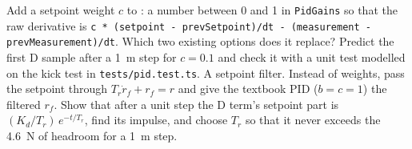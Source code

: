 \begin{exercises}
\exercise[2] Add a setpoint weight $c$ to : a number between 0 and 1 in \texttt{PidGains} so that the raw derivative is \texttt{c * (setpoint - prevSetpoint)/dt - (measurement - prevMeasurement)/dt}. Which two existing options does it replace? Predict the first D sample after a \SI{1}{m} step for $c = 0.1$ and check it with a unit test modelled on the kick test in \texttt{tests/pid.test.ts}.
\exercise[3] A setpoint filter. Instead of weights, pass the setpoint through $T_r\dot r_f + r_f = r$ and give the textbook PID ($b = c = 1$) the filtered $r_f$. Show that after a unit step the D term's setpoint part is $(K_d/T_r)\,e^{-t/T_r}$, find its impulse, and choose $T_r$ so that it never exceeds the \SI{4.6}{N} of headroom for a \SI{1}{m} step.
\end{exercises}
